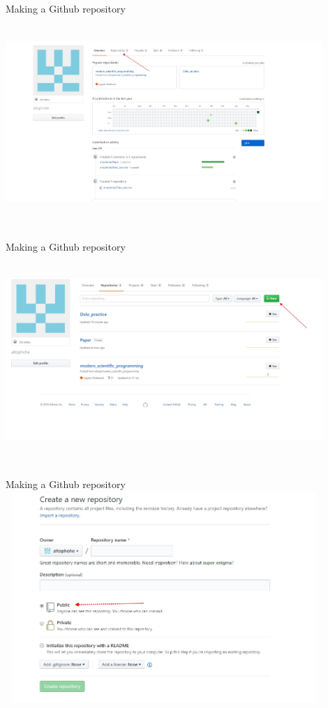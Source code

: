 \documentclass{beamer}
\begin{document}
  \begin{frame}{Making a Github repository}
           \includegraphics[width=12cm, height= 8cm]{dolo1.jpg} 
    \end{frame}
    \begin{frame}{Making a Github repository}
           \includegraphics[width=12cm, height= 8cm]{dolo2.jpg} 
    \end{frame}
     \begin{frame}{Making a Github repository}
           \includegraphics[width=12cm, height= 8cm]{dolo3.jpg} 
    \end{frame}
  
\end{document}
